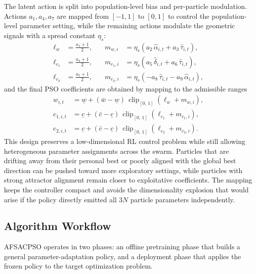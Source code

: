 \documentclass[final,5p,times]{elsarticle}
\newcommand{\symPopsize}{N}
\newcommand{\symWclipMin}{\underline{w}}
\newcommand{\symWclipMax}{\bar{w}}
\newcommand{\symCclipMin}{\underline{c}}
\newcommand{\symCclipMax}{\bar{c}}
\newcommand{\symSpread}{\eta_s}
\begin{document}
The latent action is split into population-level bias and per-particle modulation.
Actions $a_1, a_4, a_7$ are mapped from $[-1,1]$ to $[0,1]$ to control the population-level parameter setting, while the remaining actions modulate the geometric signals with a spread constant $\symSpread$:
\begin{equation}
\begin{aligned}
\ell_{w} &= \tfrac{a_1 + 1}{2}, &\quad
m_{w,i} &= \symSpread\!\left(a_2\,\hat{\alpha}_{i,t} + a_3\,\hat{\tau}_{i,t}\right), \\
\ell_{c_1} &= \tfrac{a_4 + 1}{2}, &\quad
m_{c_1,i} &= \symSpread\!\left(a_5\,\hat{\delta}_{i,t} + a_6\,\hat{\tau}_{i,t}\right), \\
\ell_{c_2} &= \tfrac{a_7 + 1}{2}, &\quad
m_{c_2,i} &= \symSpread\!\left({-a_8}\,\hat{\tau}_{i,t} - a_9\,\hat{\alpha}_{i,t}\right),
\end{aligned}
\label{eq:rank_residual_delta}
\end{equation}
and the final PSO coefficients are obtained by mapping to the admissible ranges
\begin{equation}
\begin{aligned}
w_{i,t} &= \symWclipMin + (\symWclipMax - \symWclipMin)\,\operatorname{clip}_{[0,\,1]}\!\left(\ell_{w} + m_{w,i}\right), \\
c_{1,i,t} &= \symCclipMin + (\symCclipMax - \symCclipMin)\,\operatorname{clip}_{[0,\,1]}\!\left(\ell_{c_1} + m_{c_1,i}\right), \\
c_{2,i,t} &= \symCclipMin + (\symCclipMax - \symCclipMin)\,\operatorname{clip}_{[0,\,1]}\!\left(\ell_{c_2} + m_{c_2,i}\right).
\end{aligned}
\label{eq:rank_residual_final}
\end{equation}
This design preserves a low-dimensional RL control problem while still allowing heterogeneous parameter assignments across the swarm.
Particles that are drifting away from their personal best or poorly aligned with the global best direction can be pushed toward more exploratory settings, while particles with strong attractor alignment remain closer to exploitative coefficients.
The mapping keeps the controller compact and avoids the dimensionality explosion that would arise if the policy directly emitted all $3\symPopsize$ particle parameters independently.

\subsection{Algorithm Workflow}
AFSACPSO operates in two phases: an offline pretraining phase that builds a general parameter-adaptation policy, and a deployment phase that applies the frozen policy to the target optimization problem.
\end{document}

